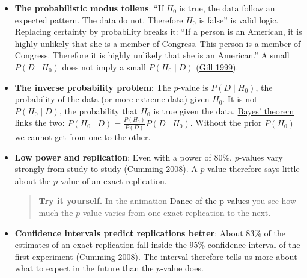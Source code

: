 \documentclass[
]{book}
\begin{document}
\begin{itemize}
  \begin{quote}
  \textbf{Try it yourself.} In the animation
  \href{https://jdegenfellner.github.io/Script_QM1_ZHAW/animations/05_Hundert_Tests_H0_wahr.html}{100 true null hypotheses}
  each tile is one test in which there is no effect at all. Choose \(\alpha = 5\,\%\) and press the button:
  in every run a few tiles light up, and at least one lights up in \(99.4\,\%\) of the runs (\(1 - 0.95^{100}\)).
  Anyone who reports only the lit tiles reports lottery winners.
  \end{quote}
\item
  \textbf{The probabilistic modus tollens}: ``If \(H_0\) is true, the data follow an expected pattern. The data do not.
  Therefore \(H_0\) is false'' is valid logic. Replacing certainty by probability breaks it:
  ``If a person is an American, it is highly unlikely that she is a member of Congress.
  This person is a member of Congress. Therefore it is highly unlikely that she is an American.''
  A small \(P(D \mid H_0)\) does not imply a small \(P(H_0 \mid D)\)
  (\href{https://doi.org/10.1177/106591299905200309}{Gill 1999}).
\item
  \textbf{The inverse probability problem}: The \(p\)-value is \(P(D \mid H_0)\), the probability of the data
  (or more extreme data) given \(H_0\). It is not \(P(H_0 \mid D)\), the probability that \(H_0\) is true given the data.
  \hyperref[bayes_statistics]{Bayes' theorem} links the two: \(P(H_0 \mid D) = \frac{P(H_0)}{P(D)} P(D \mid H_0)\).
  Without the prior \(P(H_0)\) we cannot get from one to the other.
\item
  \textbf{Low power and replication}: Even with a power of 80\%, \(p\)-values vary strongly from study to study
  (\href{https://doi.org/10.1111/j.1745-6924.2008.00079.x}{Cumming 2008}). A \(p\)-value therefore says little
  about the \(p\)-value of an exact replication.

  \begin{quote}
  \textbf{Try it yourself.} In the animation
  \href{https://jdegenfellner.github.io/Script_QM1_ZHAW/animations/17_Dance_of_the_p_values.html}{Dance of the p-values}
  you see how much the \(p\)-value varies from one exact replication to the next.
  \end{quote}
\item
  \textbf{Confidence intervals predict replications better}: About 83\% of the estimates of an exact replication
  fall inside the 95\% confidence interval of the first experiment
  (\href{https://doi.org/10.1111/j.1745-6924.2008.00079.x}{Cumming 2008}). The interval therefore tells us more
  about what to expect in the future than the \(p\)-value does.


\end{itemize}
\end{document}
